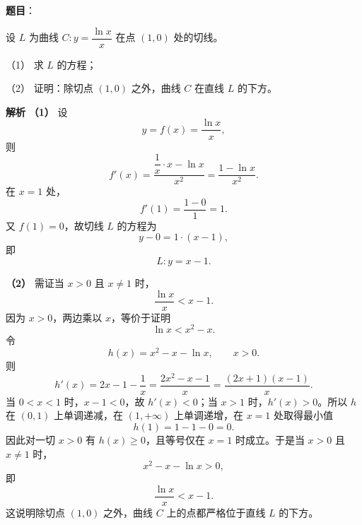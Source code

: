 \begin{answer}



\end{answer}
\begin{answer}

\textbf{题目}：

设 $L$ 为曲线 $C:y=\dfrac{\ln x}{x}$ 在点 $(1,0)$ 处的切线。

（1） 求 $L$ 的方程；

（2） 证明：除切点 $(1,0)$ 之外，曲线 $C$ 在直线 $L$ 的下方。

\textbf{解析}
\textbf{（1）} 设
\nopagebreak[4]
\[y=f(x)=\frac{\ln x}{x},\]
则
\nopagebreak[4]
\[f'(x)=\frac{\dfrac1x\cdot x-\ln x}{x^2}=\frac{1-\ln x}{x^2}.\]
在 $x=1$ 处，
\nopagebreak[4]
\[f'(1)=\frac{1-0}{1}=1.\]
又 $f(1)=0$，故切线 $L$ 的方程为
\nopagebreak[4]
\[y-0=1\cdot(x-1),\]
即
\nopagebreak[4]
\[L:y=x-1.\]

\textbf{（2）} 需证当 $x>0$ 且 $x\neq1$ 时，
\nopagebreak[4]
\[\frac{\ln x}{x}<x-1.\]
因为 $x>0$，两边乘以 $x$，等价于证明
\nopagebreak[4]
\[\ln x<x^2-x.\]
令
\nopagebreak[4]
\[h(x)=x^2-x-\ln x,\qquad x>0.\]
则
\nopagebreak[4]
\[h'(x)=2x-1-\frac1x=\frac{2x^2-x-1}{x}=\frac{(2x+1)(x-1)}{x}.\]
当 $0<x<1$ 时，$x-1<0$，故 $h'(x)<0$；当 $x>1$ 时，$h'(x)>0$。所以 $h$ 在 $(0,1)$ 上单调递减，在 $(1,+\infty)$ 上单调递增，在 $x=1$ 处取得最小值
\nopagebreak[4]
\[h(1)=1-1-0=0.\]
因此对一切 $x>0$ 有 $h(x)\geqslant0$，且等号仅在 $x=1$ 时成立。于是当 $x>0$ 且 $x\neq1$ 时，
\nopagebreak[4]
\[x^2-x-\ln x>0,\]
即
\nopagebreak[4]
\[\frac{\ln x}{x}<x-1.\]
这说明除切点 $(1,0)$ 之外，曲线 $C$ 上的点都严格位于直线 $L$ 的下方。



\end{answer}
